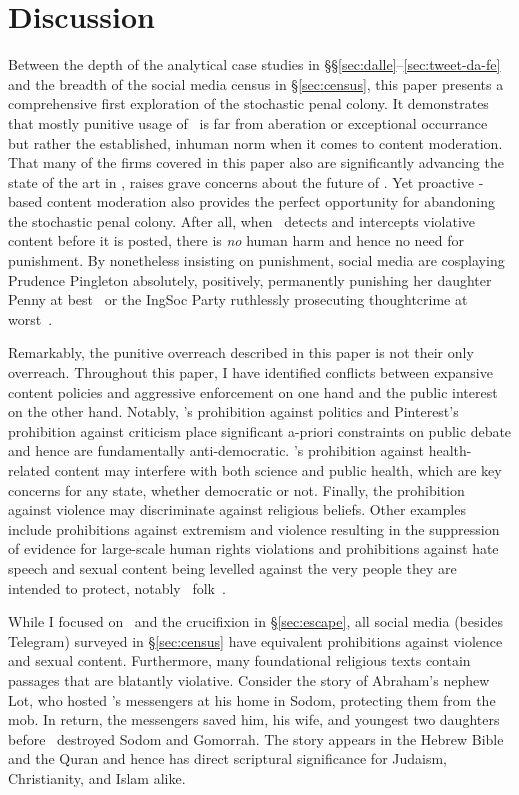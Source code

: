 \section{Discussion}
\label{sec:discussion}

Between the depth of the analytical case studies in
\S\S\ref{sec:dalle}--\ref{sec:tweet-da-fe} and the breadth of the social media
census in \S\ref{sec:census}, this paper presents a comprehensive first
exploration of the stochastic penal colony. It demonstrates that mostly punitive
usage of \AI\ is far from aberation or exceptional occurrance but rather the
established, inhuman norm when it comes to content moderation. That many of the
firms covered in this paper also are significantly advancing the state of the
art in \AI, raises grave concerns about the future of \AI. Yet proactive
\AI-based content moderation also provides the perfect opportunity for
abandoning the stochastic penal colony. After all, when \AI\ detects and
intercepts violative content before it is posted, there is \emph{no} human harm
and hence no need for punishment. By nonetheless insisting on punishment, social
media are cosplaying Prudence Pingleton absolutely, positively, permanently
punishing her daughter Penny at best~\cite{Waters1988} or the IngSoc Party
ruthlessly prosecuting thoughtcrime at worst~\cite{Orwell1949}.

Remarkably, the punitive overreach described in this paper is not their only
overreach. Throughout this paper, I have identified conflicts between expansive
content policies and aggressive enforcement on one hand and the public interest
on the other hand. Notably, \DALLE's prohibition against politics and
Pinterest's prohibition against criticism place significant a-priori constraints
on public debate and hence are fundamentally anti-democratic. \DALLE's
prohibition against health-related content may interfere with both science and
public health, which are key concerns for any state, whether democratic or not.
Finally, the prohibition against violence may discriminate against religious
beliefs. Other examples include prohibitions against extremism and violence
resulting in the suppression of evidence for large-scale human rights violations
and prohibitions against hate speech and sexual content being levelled against
the very people they are intended to protect, notably \LGBT\
folk~\cite{EidelmanLeeea2021,RahmanAlJaloudAlKhatibea2019,Wille2020}.

While I focused on \DALLE\ and the crucifixion in \S\ref{sec:escape}, all social
media (besides Telegram) surveyed in \S\ref{sec:census} have equivalent
prohibitions against violence and sexual content. Furthermore, many foundational
religious texts contain passages that are blatantly violative. Consider the
story of Abraham's nephew Lot, who hosted \YHWH's messengers at his home in
Sodom, protecting them from the mob. In return, the messengers saved him, his
wife, and youngest two daughters before \YHWH\ destroyed Sodom and Gomorrah. The
story appears in the Hebrew Bible and the Quran and hence has direct scriptural
significance for Judaism, Christianity, and Islam alike.

